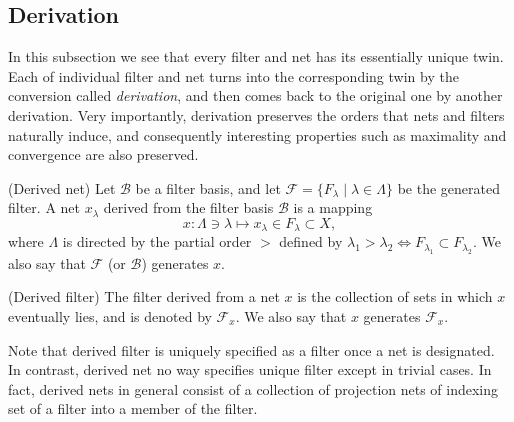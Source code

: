 \documentclass{report}
\begin{document}
\subsection{Derivation} \label{derivation}
In this subsection we see that every filter and net has its essentially unique twin. Each of individual filter and net turns into the corresponding twin by the conversion called \textit{derivation}, and then comes back to the original one by another derivation. Very importantly, derivation preserves the orders that nets and filters naturally induce, and consequently interesting properties such as maximality and convergence are also preserved.

\begin{dfn} (Derived net)
    Let \( \mathscr{B} \) be a filter basis, and let \( \mathscr{F} = \{F_{\lambda} \mid \lambda \in \Lambda \} \) be the generated filter.
    A net \( x_{\lambda} \) derived from the filter basis \( \mathscr{B} \) is a mapping
    \begin{equation*}
        x: \Lambda \ni \lambda \mapsto x_{\lambda} \in F_{\lambda} \subset X,
    \end{equation*}
    where \( \Lambda \) is directed by the partial order \( > \) defined by \( \lambda_1> \lambda_2 \iff F_{\lambda_1} \subset F_{\lambda_2} \).
    We also say that \( \mathscr{F} \) (or \( \mathscr{B} \)) generates \( x \).
\end{dfn}

\begin{dfn} (Derived filter)
    The filter derived from a net \( x \) is the collection of sets in which \( x \) eventually lies, and is denoted by \( \mathscr{F}_x \). We also say that \( x \) generates \( \mathscr{F}_x \).
\end{dfn}

\begin{rem}
    Note that derived filter is uniquely specified as a filter once a net is designated.
    In contrast, derived net no way specifies unique filter except in trivial cases. In fact, derived nets in general consist of a collection of projection nets of indexing set of a filter into a member of the filter.
\end{rem}
\end{document}
